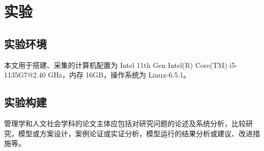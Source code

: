 
\section{实验}
\label{section:experiment}
\subsection{实验环境}
本文用于搭建、采集的计算机配置为 Intel 11th Gen Intel(R) Core(TM) i5-1135G7@2.40 GHz，内存 16GB，操作系统为 Linux-6.5.1。
\subsection{实验构建}
管理学和人文社会学科的论文主体应包括对研究问题的论述及系统分析，比较研究，模型或方案设计，案例论证或实证分析，模型运行的结果分析或建议、改进措施等。
